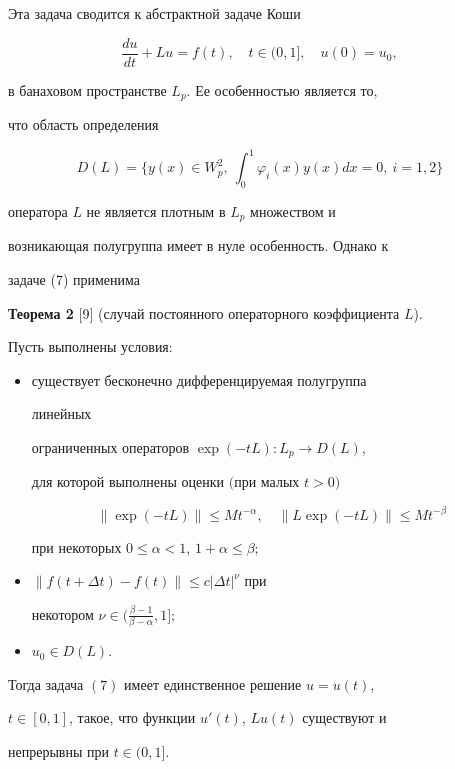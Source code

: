 Эта задача сводится к абстрактной задаче Коши 


\begin{equation} 


\frac{d u}{d t}+L u=f(t),\quad t\in(0,1],\quad 


u(0)=u_0, 


\end{equation} 


в банаховом пространстве $L_p$. Ее особенностью является то, 


что область определения  


$$ 


D(L)=\bigg\{y(x)\in W^2_p,\ \int^1_0 


\varphi_i(x)y(x)dx=0,\ i=1,2\bigg\} 


$$ 


оператора $L$ не является плотным в $L_p$ множеством и 


возникающая полугруппа имеет в нуле особенность. Однако к 


задаче (7) применима 


\medskip 


 


{\bf Теорема 2} [9] (случай постоянного операторного коэффициента $L$). 


{\it  


Пусть выполнены условия${:}$ 


\begin{itemize} 


\item[$1^\circ$.] существует бесконечно дифференцируемая полугруппа 


линейных  


ограниченных операторов $\exp(-t L):L_p\to D(L)$, 


для которой выполнены оценки $($при малых $t>0)$ 


\begin{equation} 


\|\exp(-t L)\|\le M t^{-\alpha},\quad 


\|L\exp(-t L)\|\le M t^{-\beta} 


\end{equation} 


при некоторых $0\le\alpha<1$, $1+\alpha\le\beta;$ 


\item[$2^\circ$.] $\|f(t+\Delta t)-f(t)\|\le c|\Delta t|^\nu$ при 


некотором $\nu\in\big(\frac{\beta-1}{\beta-\alpha},1\big];$ 


\item[$3^\circ$.] $u_0\in D(L)$. 


\end{itemize} 


Тогда задача $(7)$ имеет единственное решение $u=u(t)$, 


$t\in[0,1]$, такое, что функции $u'(t)$, $L u(t)$ существуют и 


непрерывны при $t\in(0,1]$. 


} 


